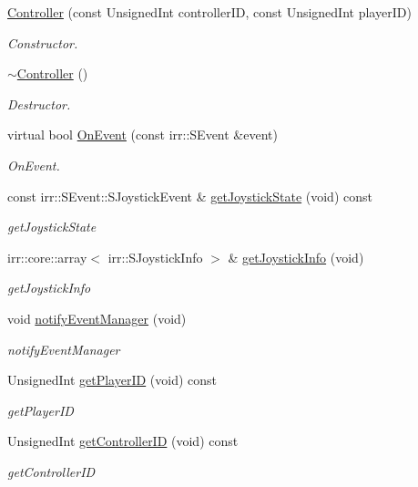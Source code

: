 \begin{DoxyCompactItemize}
\item 
\hyperlink{classController_af2b33f3f5b26f33b9d226d24d3fd5e84}{Controller} (const Unsigned\+Int controller\+ID, const Unsigned\+Int player\+ID)
\begin{DoxyCompactList}\small\item\em Constructor. \end{DoxyCompactList}\item 
\hyperlink{classController_a0ab87934c4f7a266cfdb86e0f36bc1b5}{$\sim$\+Controller} ()
\begin{DoxyCompactList}\small\item\em Destructor. \end{DoxyCompactList}\item 
virtual bool \hyperlink{classController_a81b6f6d728022c92b064866759a7d4d9}{On\+Event} (const irr\+::\+S\+Event \&event)
\begin{DoxyCompactList}\small\item\em On\+Event. \end{DoxyCompactList}\item 
const irr\+::\+S\+Event\+::\+S\+Joystick\+Event \& \hyperlink{classController_a43d5202e40ae827029fdca587d0bfeab}{get\+Joystick\+State} (void) const
\begin{DoxyCompactList}\small\item\em get\+Joystick\+State \end{DoxyCompactList}\item 
irr\+::core\+::array$<$ irr\+::\+S\+Joystick\+Info $>$ \& \hyperlink{classController_a1d628add26120f35d2dc53eabaa34d4b}{get\+Joystick\+Info} (void)
\begin{DoxyCompactList}\small\item\em get\+Joystick\+Info \end{DoxyCompactList}\item 
void \hyperlink{classController_a3e855bf7e018e2659ecb3d0e13a7f39c}{notify\+Event\+Manager} (void)
\begin{DoxyCompactList}\small\item\em notify\+Event\+Manager \end{DoxyCompactList}\item 
Unsigned\+Int \hyperlink{classController_a76891bd0871480c92f45c597c3eddf93}{get\+Player\+ID} (void) const
\begin{DoxyCompactList}\small\item\em get\+Player\+ID \end{DoxyCompactList}\item 
Unsigned\+Int \hyperlink{classController_ab2294a9b730b80216705b7e9ae36a5bd}{get\+Controller\+ID} (void) const
\begin{DoxyCompactList}\small\item\em get\+Controller\+ID \end{DoxyCompactList}\end{DoxyCompactItemize}


